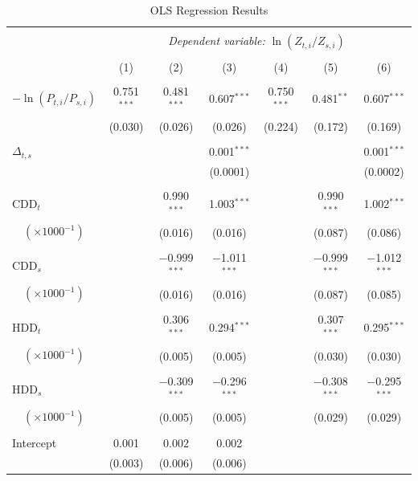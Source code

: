 \documentclass[11pt,a4paper]{extarticle}
\begin{document}
\begin{table}[!t] \centering 
	\caption{OLS Regression Results}
	\label{table:1} 
	\small
	\begin{tabular}{@{\extracolsep{5pt}}lcccccc} 
		\\[-4ex]\hline  
		\hline \\[-1.8ex] 
		& \multicolumn{6}{c}{\textit{Dependent variable:} $\ln (Z_{ t, i} / Z_{ s, i})$} \\ [0.5ex]
		\cline{2-7} 
		\\[-1.8ex] & (1) & (2) & (3) & (4) & (5) & (6)\\ [0.5ex]
		\hline \\[-1.8ex] 
		$-\ln (P_{t,i} / P_{s,i})$ & 0.751$^{***}$ & 0.481$^{***}$ & 0.607$^{***}$ & 0.750$^{***}$ & 0.481$^{**}$ & 0.607$^{***}$ \\ 
		& (0.030) & (0.026) & (0.026) & (0.224) & (0.172) & (0.169) \\ 
		& & & & & & \\ 
		$\Delta_{t,s}$ &  &  & 0.001$^{***}$ &  &  & 0.001$^{***}$ \\ 
		&  &  & (0.0001) &  &  & (0.0002) \\ 
		& & & & & & \\ 
		CDD$_t$ &  & 0.990$^{***}$ & 1.003$^{***}$ &  & 0.990$^{***}$ & 1.002$^{***}$ \\ 
		$\quad(\times 1000^{-1})$&  & (0.016) & (0.016) &  & (0.087) & (0.086) \\ 
		& & & & & & \\ 
		CDD$_s$ &  & $-$0.999$^{***}$ & $-$1.011$^{***}$ &  & $-$0.999$^{***}$ & $-$1.012$^{***}$ \\ 
		$\quad(\times 1000^{-1})$&  & (0.016) & (0.016) &  & (0.087) & (0.085) \\ 
		& & & & & & \\ 
		HDD$_t$ &  & 0.306$^{***}$ & 0.294$^{***}$ &  & 0.307$^{***}$ & 0.295$^{***}$ \\ 
		$\quad(\times 1000^{-1})$&  & (0.005) & (0.005) &  & (0.030) & (0.030) \\ 
		& & & & & & \\ 
		HDD$_s$ &  & $-$0.309$^{***}$ & $-$0.296$^{***}$ &  & $-$0.308$^{***}$ & $-$0.295$^{***}$ \\ 
		$\quad(\times 1000^{-1})$&  & (0.005) & (0.005) &  & (0.029) & (0.029) \\ 
		& & & & & & \\ 
		Intercept & 0.001 & 0.002 & 0.002 &  &  &  \\ 
		& (0.003) & (0.006) & (0.006) &  &  &  \\ 

\end{tabular}
\end{table}
\end{document}
